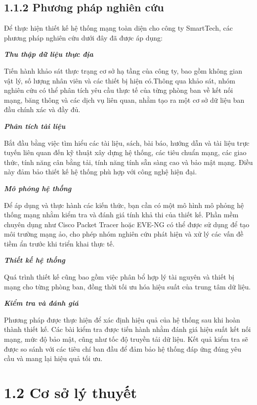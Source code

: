 \subsection*{1.1.2 Phương pháp nghiên cứu}
Để thực hiện thiết kế hệ thống mạng toàn diện cho công ty SmartTech, các phương pháp nghiên cứu dưới đây đã được áp dụng:

\textbf{\textit{Thu thập dữ liệu thực địa}}

Tiến hành khảo sát thực trạng cơ sở hạ tầng của công ty, bao gồm không gian vật lý, số lượng nhân viên và các thiết bị hiện có.Thông qua khảo sát, nhóm nghiên cứu có thể phân tích yêu cầu thực tế của từng phòng ban về kết nối mạng, băng thông và các dịch vụ liên quan, nhằm tạo ra một cơ sở dữ liệu ban đầu chính xác và đầy đủ.

\textbf{\textit{Phân tích tài liệu}}

Bắt đầu bằng việc tìm hiểu các tài liệu, sách, bài báo, hướng dẫn và tài liệu trực tuyến liên quan đến kỹ thuật xây dựng hệ thống, các tiêu chuẩn mạng, các giao thức, tính năng cân bằng tải, tính năng tính sẵn sàng cao và bảo mật mạng. Điều này đảm bảo thiết kế hệ thống phù hợp với công nghệ hiện đại.

\textbf{\textit{Mô phỏng hệ thống}}

Để áp dụng và thực hành các kiến thức, bạn cần có một mô hình mô phỏng hệ thống mạng nhằm kiểm tra và đánh giá tính khả thi của thiết kế. Phần mềm chuyên dụng như Cisco Packet Tracer hoặc EVE-NG có thể được sử dụng để tạo môi trường mạng ảo, cho phép nhóm nghiên cứu phát hiện và xử lý các vấn đề tiềm ẩn trước khi triển khai thực tế.

\textbf{\textit{Thiết kế hệ thống}}

Quá trình thiết kế cũng bao gồm việc phân bổ hợp lý tài nguyên và thiết bị mạng cho từng phòng ban, đồng thời tối ưu hóa hiệu suất của trung tâm dữ liệu.

\textbf{\textit{Kiểm tra và đánh giá}}

Phương pháp được thực hiện để xác định hiệu quả của hệ thống sau khi hoàn thành thiết kế. Các bài kiểm tra được tiến hành nhằm đánh giá hiệu suất kết nối mạng, mức độ bảo mật, cũng như tốc độ truyền tải dữ liệu. Kết quả kiểm tra sẽ được so sánh với các tiêu chí ban đầu để đảm bảo hệ thống đáp ứng đúng yêu cầu và mang lại hiệu quả tối ưu.

\section*{1.2 Cơ sở lý thuyết}


